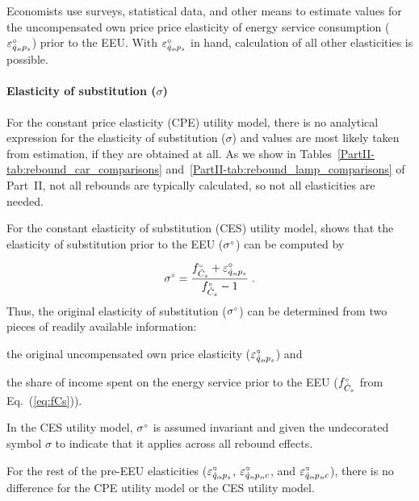 \documentclass[12pt]{article}\usepackage[]{graphicx}\usepackage[]{xcolor}
\begin{document}
Economists use surveys, statistical data, and other means to 
estimate values for the uncompensated own price price elasticity 
of energy service consumption ($\varepsilon^\circ_{\dot{q}_s\!,p_s}$)
prior to the EEU.
With $\varepsilon^\circ_{\dot{q}_s\!,p_s}$ in hand, calculation of all other elasticities is possible.


\paragraph{Elasticity of substitution ($\sigma$)} 

For the constant price elasticity (CPE) utility model, 
there is no analytical expression for the elasticity of substitution ($\sigma$) and
values are most likely taken from estimation, if they are obtained at all. 
As we show in Tables~\ref{PartII-tab:rebound_car_comparisons} and~\ref{PartII-tab:rebound_lamp_comparisons} of Part~II, 
not all rebounds are typically calculated, so not all elasticities are needed.

For the constant elasticity of substitution (CES) utility model, 
\citet{Gortz1977} shows that
the elasticity of substitution
prior to the EEU (${}{\sigma}^{\scriptscriptstyle \circ}$) can be computed by

\begin{equation} \label{eq:sigma}
  {}{\sigma}^{\scriptscriptstyle \circ} = \frac{{}{f}^{\scriptscriptstyle \circ}_{\dot{C}_s} + \varepsilon^\circ_{\dot{q}_s\!,p_s}}{{}{f}^{\scriptscriptstyle \circ}_{\dot{C}_s} - 1} \; .
\end{equation}
%
Thus, the original elasticity of substitution (${}{\sigma}^{\scriptscriptstyle \circ}$) 
can be determined from two pieces of readily available information:
%
\begin{enumerate*}[label={(\roman*)}]
	
  \item the original uncompensated own price elasticity ($\varepsilon^\circ_{\dot{q}_s\!,p_s}$) and 
  
  \item the share of income spent on the energy service prior to the EEU (${}{f}^{\scriptscriptstyle \circ}_{\dot{C}_s}$ 
        from Eq.~(\ref{eq:fCs})).

\end{enumerate*}
%
In the CES utility model, ${}{\sigma}^{\scriptscriptstyle \circ}$ is assumed invariant
and given the undecorated symbol $\sigma$
to indicate that it applies across all rebound effects.

For the rest of the pre-EEU elasticities ($\varepsilon^\circ_{\dot{q}_o\!,p_s}$, $\varepsilon^\circ_{\dot{q}_s\!,p_s\!,c}$, and $\varepsilon^\circ_{\dot{q}_o\!,p_s\!,c}$),
there is no difference for the CPE utility model or the CES utility model.


\end{document}
